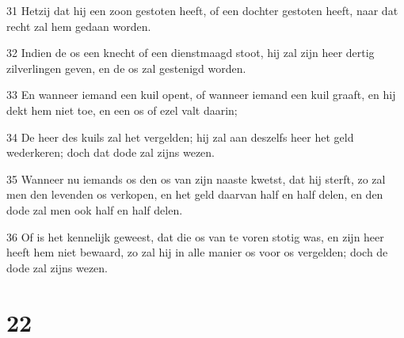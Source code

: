 \par 31 Hetzij dat hij een zoon gestoten heeft, of een dochter gestoten heeft, naar dat recht zal hem gedaan worden.
\par 32 Indien de os een knecht of een dienstmaagd stoot, hij zal zijn heer dertig zilverlingen geven, en de os zal gestenigd worden.
\par 33 En wanneer iemand een kuil opent, of wanneer iemand een kuil graaft, en hij dekt hem niet toe, en een os of ezel valt daarin;
\par 34 De heer des kuils zal het vergelden; hij zal aan deszelfs heer het geld wederkeren; doch dat dode zal zijns wezen.
\par 35 Wanneer nu iemands os den os van zijn naaste kwetst, dat hij sterft, zo zal men den levenden os verkopen, en het geld daarvan half en half delen, en den dode zal men ook half en half delen.
\par 36 Of is het kennelijk geweest, dat die os van te voren stotig was, en zijn heer heeft hem niet bewaard, zo zal hij in alle manier os voor os vergelden; doch de dode zal zijns wezen.

\chapter{22}

